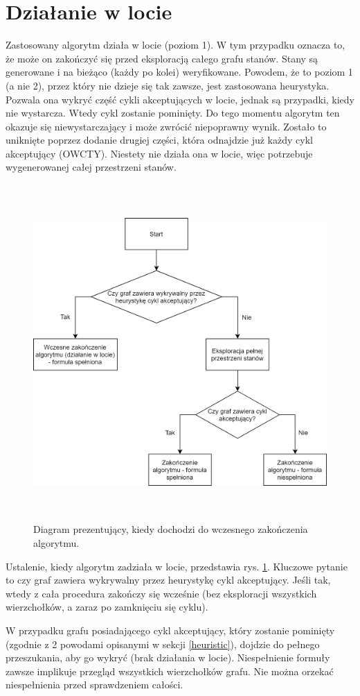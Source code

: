 \newpage
\section{Działanie w locie}

Zastosowany algorytm działa w locie (poziom 1).
W tym przypadku oznacza to, że może on zakończyć się przed eksploracją całego grafu stanów.
Stany są generowane i na bieżąco (każdy po kolei) weryfikowane.
Powodem, że to poziom 1 (a nie 2), przez który nie dzieje się tak zawsze, jest zastosowana heurystyka.
Pozwala ona wykryć część cykli akceptujących w locie, jednak są przypadki, kiedy nie wystarcza.
Wtedy cykl zostanie pominięty.
Do tego momentu algorytm ten okazuje się niewystarczający i może zwrócić niepoprawny wynik.
Zostało to uniknięte poprzez dodanie drugiej części, która odnajdzie już każdy cykl akceptujący (OWCTY).
Niestety nie działa ona w locie, więc potrzebuje wygenerowanej całej przestrzeni stanów.

\begin{figure}[h]
    \centering
    \includegraphics[height=12.8cm,keepaspectratio]{img/on-the-fly-diagram.png}
    \caption{Diagram prezentujący, kiedy dochodzi do wczesnego zakończenia algorytmu.}
    \label{fig:on_the_fly_diagram}
\end{figure}

Ustalenie, kiedy algorytm zadziała w locie, przedstawia rys. \ref{fig:on_the_fly_diagram}.
Kluczowe pytanie to czy graf zawiera wykrywalny przez heurystykę cykl akceptujący.
Jeśli tak, wtedy z cała procedura zakończy się wcześnie (bez eksploracji wszystkich wierzchołków, a zaraz po zamknięciu się cyklu).

W przypadku grafu posiadającego cykl akceptujący, który zostanie pominięty (zgodnie z 2 powodami opisanymi w sekcji \ref{heuristic}), dojdzie do pełnego przeszukania, aby go wykryć (brak działania w locie).
Niespełnienie formuły zawsze implikuje przegląd wszystkich wierzchołków grafu.
Nie można orzekać niespełnienia przed sprawdzeniem całości.
